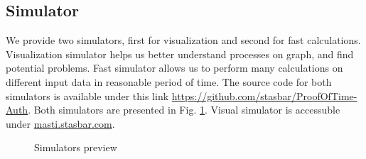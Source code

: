 \documentclass[nostrict]{szablonPG}
\begin{document}
\subsection{Simulator}
We provide two simulators, first for visualization and second for fast calculations. Visualization simulator helps us better understand processes on graph, and find potential problems. Fast simulator allows us to perform many calculations on different input data in reasonable period of time. The source code for both simulators is available under this link \url{https://github.com/stasbar/ProofOfTime-Auth}. Both simulators are presented in Fig. \ref{fig:simulators}. Visual simulator is accessuble under \url{masti.stasbar.com}.
\begin{figure}[h!]
 \hfill 	
\caption{Simulators preview}
\label{fig:simulators}
\end{figure}
\end{document}
